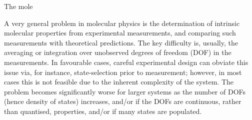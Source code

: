 The mole

A very general problem in molecular physics is the determination of intrinsic molecular properties from experimental measurements, and comparing such measurements with theoretical predictions. The key difficulty is, usually, the averaging or integration over unobserved degrees of freedom (DOF) in the measurements. In favourable cases, careful experimental design can obviate this issue via, for instance, state-selection prior to measurement; however, in most cases this is not feasible due to the inherent complexity of the system. The problem becomes significantly worse for larger systems as the number of DOFs (hence density of states) increases, and/or if the DOFs are continuous, rather than quantised, properties, and/or if many states are populated.